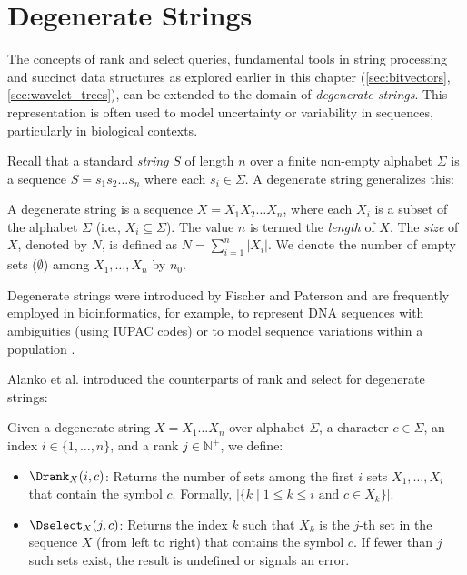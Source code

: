\section{Degenerate Strings}
\label{sec:degenerate_strings} %

The concepts of \textsf{rank} and \textsf{select} queries, fundamental tools in string processing and succinct data structures as explored earlier in this chapter (\autoref{sec:bitvectors}, \autoref{sec:wavelet_trees}), can be extended to the domain of \emph{degenerate strings}. This representation is often used to model uncertainty or variability in sequences, particularly in biological contexts.

Recall that a standard \emph{string} $S$ of length $n$ over a finite non-empty alphabet $\Sigma$ is a sequence $S = s_1 s_2 \dots s_n$ where each $s_i \in \Sigma$. A degenerate string generalizes this:

\begin{definition} \label{def:degenerate_string}
    A degenerate string is a sequence $X = X_1 X_2 \dots X_n$, where each $X_i$ is a subset of the alphabet $\Sigma$ (i.e., $X_i \subseteq \Sigma$). The value $n$ is termed the \emph{length} of $X$. The \emph{size} of $X$, denoted by $N$, is defined as $N = \sum_{i=1}^{n} |X_i|$. We denote the number of empty sets ($\emptyset$) among $X_1, \dots, X_n$ by $n_0$.
\end{definition}

Degenerate strings were introduced by Fischer and Paterson \cite{fischer1974string} and are frequently employed in bioinformatics, for example, to represent DNA sequences with ambiguities (using IUPAC codes) or to model sequence variations within a population \cite{SubsetWT, alzamel2018degenerate}.

Alanko et al. \cite{SubsetWT} introduced the counterparts of rank and select for degenerate strings:

\begin{definition} \label{def:subset_rank_select}
    Given a degenerate string $X = X_1 \dots X_n$ over alphabet $\Sigma$, a character $c \in \Sigma$, an index $i \in \{1, \dots, n\}$, and a rank $j \in \mathbb{N}^+$, we define:
    \begin{itemize}
        \item $\Drank_X(i, c)$: Returns the number of sets among the first $i$ sets $X_1, \dots, X_i$ that contain the symbol $c$. Formally, $|\{k \mid 1 \le k \le i \text{ and } c \in X_k\}|$.
        \item $\Dselect_X(j, c)$: Returns the index $k$ such that $X_k$ is the $j$-th set in the sequence $X$ (from left to right) that contains the symbol $c$. If fewer than $j$ such sets exist, the result is undefined or signals an error.
    \end{itemize}
\end{definition}


